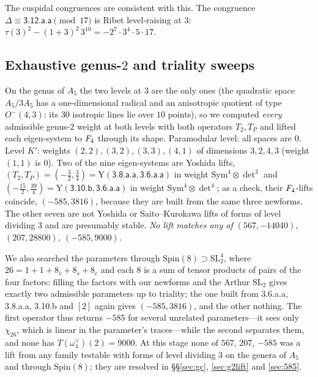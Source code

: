 \documentclass[11pt]{amsart}
\theoremstyle{definition}
\begin{document}
The cuspidal congruences are consistent with this. The congruence $\Delta\equiv\textsf{3.12.a.a}\pmod{17}$ is Ribet level-raising at $3$: $\tau(3)^2-(1+3)^2\,3^{10}=-2^7\cdot3^4\cdot5\cdot17$.

\subsection{Exhaustive genus-$2$ and triality sweeps} On the genus of $A_5$ the two levels at $3$ are the only ones (the quadratic space $A_5/3A_5$ has a one-dimensional radical and an anisotropic quotient of type $O^-(4,3)$: its $30$ isotropic lines lie over $10$ points), so we computed \emph{every} admissible genus-$2$ weight at both levels with both operators $T_2,T_P$ and lifted each eigen-system to $F_4$ through its shape. Paramodular level: all spaces are $0$. Level $K'$: weights $(2,2),(3,2),(3,3),(4,1)$ of dimensions $3,2,4,3$ (weight $(1,1)$ is $0$). Two of the nine eigen-systems are Yoshida lifts, $(T_2,T_P)=(-\tfrac32,\tfrac34)=\mathrm{Y}(\textsf{3.8.a.a},\textsf{3.6.a.a})$ in weight $\mathrm{Sym}^4\otimes\det^3$ and $(-\tfrac{15}2,\tfrac{39}4)=\mathrm{Y}(\textsf{3.10.b},\textsf{3.6.a.a})$ in weight $\mathrm{Sym}^4\otimes\det^4$; as a check, their $F_4$-lifts coincide, $(-585,3816)$, because they are built from the same three newforms. The other seven are not Yoshida or Saito--Kurokawa lifts of forms of level dividing $3$ and are presumably stable. \emph{No lift matches any of $(567,-14040)$, $(207,28800)$, $(-585,9000)$.}

We also searched the parameters through $\mathrm{Spin}(8)\supset\mathrm{SL}_2^4$, where $26=1+1+8_v+8_s+8_c$ and each $8$ is a sum of tensor products of pairs of the four factors: filling the factors with our newforms and the Arthur $\mathrm{SL}_2$ gives exactly two admissible parameters up to triality; the one built from \textsf{3.6.a.a}, \textsf{3.8.a.a}, \textsf{3.10.b} and $[2]$ again gives $(-585,3816)$, and the other nothing. The first operator thus returns $-585$ for several unrelated parameters---it sees only $\chi_{26}$, which is linear in the parameter's traces---while the second separates them, and none has $T(\omega_4^\vee)(2)=9000$. At this stage none of $567$, $207$, $-585$ was a lift from any family testable with forms of level dividing $3$ on the genera of $A_5$ and through $\mathrm{Spin}(8)$; they are resolved in \S\S\ref{sec:gc}, \ref{sec:g2lift} and \ref{sec:585}.
\end{document}

